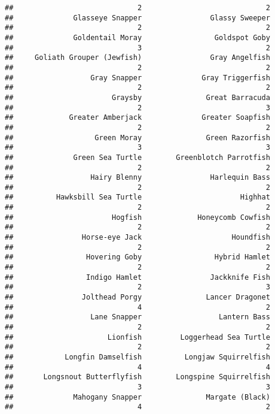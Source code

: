 \documentclass[
]{article}
\begin{document}
\begin{verbatim}
##                             2                             2 
##              Glasseye Snapper                Glassy Sweeper 
##                             2                             2 
##              Goldentail Moray                 Goldspot Goby 
##                             3                             2 
##     Goliath Grouper (Jewfish)                Gray Angelfish 
##                             2                             2 
##                  Gray Snapper              Gray Triggerfish 
##                             2                             2 
##                       Graysby               Great Barracuda 
##                             2                             3 
##             Greater Amberjack              Greater Soapfish 
##                             2                             2 
##                   Green Moray               Green Razorfish 
##                             3                             3 
##              Green Sea Turtle        Greenblotch Parrotfish 
##                             2                             2 
##                  Hairy Blenny                Harlequin Bass 
##                             2                             2 
##          Hawksbill Sea Turtle                       Highhat 
##                             2                             2 
##                       Hogfish             Honeycomb Cowfish 
##                             2                             2 
##                Horse-eye Jack                     Houndfish 
##                             2                             2 
##                 Hovering Goby                 Hybrid Hamlet 
##                             2                             2 
##                 Indigo Hamlet                Jackknife Fish 
##                             2                             3 
##                Jolthead Porgy               Lancer Dragonet 
##                             4                             2 
##                  Lane Snapper                  Lantern Bass 
##                             2                             2 
##                      Lionfish         Loggerhead Sea Turtle 
##                             2                             2 
##            Longfin Damselfish          Longjaw Squirrelfish 
##                             4                             4 
##       Longsnout Butterflyfish        Longspine Squirrelfish 
##                             3                             3 
##              Mahogany Snapper               Margate (Black) 
##                             4                             2 

\end{verbatim}
\end{document}
